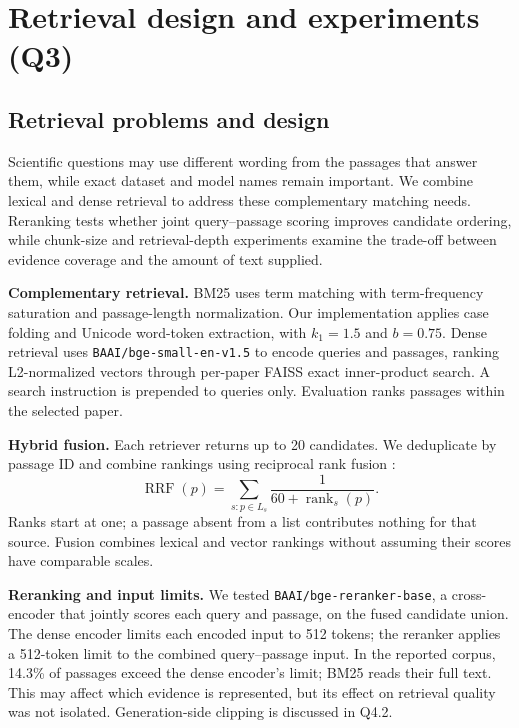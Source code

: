 \section{Retrieval design and experiments (Q3)}
\subsection{Retrieval problems and design}
Scientific questions may use different wording from the passages that answer them, while exact dataset and model names remain important. We combine lexical and dense retrieval to address these complementary matching needs. Reranking tests whether joint query--passage scoring improves candidate ordering, while chunk-size and retrieval-depth experiments examine the trade-off between evidence coverage and the amount of text supplied.

\textbf{Complementary retrieval.} BM25 \citep{robertson2009bm25} uses term matching with term-frequency saturation and passage-length normalization. Our implementation applies case folding and Unicode word-token extraction, with $k_1=1.5$ and $b=0.75$. Dense retrieval uses \texttt{BAAI/bge-small-en-v1.5} \citep{baai2023bgesmallv15} to encode queries and passages, ranking L2-normalized vectors through per-paper FAISS exact inner-product search. A search instruction is prepended to queries only. Evaluation ranks passages within the selected paper.

\textbf{Hybrid fusion.} Each retriever returns up to 20 candidates. We deduplicate by passage ID and combine rankings using reciprocal rank fusion \citep{cormack2009rrf}:
\begin{equation}
\operatorname{RRF}(p)=\sum_{s:p\in L_s}\frac{1}{60+\operatorname{rank}_s(p)}.
\end{equation}
Ranks start at one; a passage absent from a list contributes nothing for that source. Fusion combines lexical and vector rankings without assuming their scores have comparable scales.

\textbf{Reranking and input limits.} We tested \texttt{BAAI/bge-reranker-base}, a cross-encoder that jointly scores each query and passage, on the fused candidate union. The dense encoder limits each encoded input to 512 tokens; the reranker applies a 512-token limit to the combined query--passage input. In the reported corpus, 14.3\% of passages exceed the dense encoder's limit; BM25 reads their full text. This may affect which evidence is represented, but its effect on retrieval quality was not isolated. Generation-side clipping is discussed in Q4.2.

